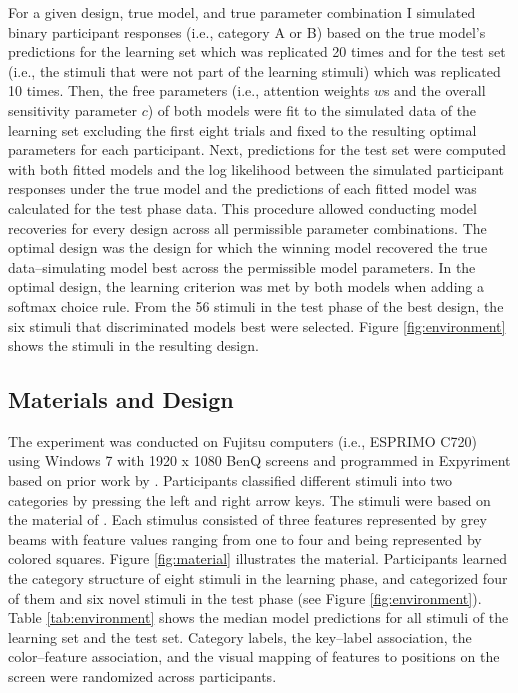 \documentclass[a4paper,man,natbib]{apa6}
\begin{document}
For a given design, true model, and true parameter combination I simulated binary participant responses (i.e., category A or B) based on the true model's predictions for the learning set which was replicated 20 times and for the test set (i.e., the stimuli that were not part of the learning stimuli) which was replicated 10 times. Then, the free parameters (i.e., attention weights $w$s and the overall sensitivity parameter $c$) of both models were fit to the simulated data of the learning set excluding the first eight trials and fixed to the resulting optimal parameters for each participant. Next, predictions for the test set were computed with both fitted models and the log likelihood between the simulated participant responses under the true model and the predictions of each fitted model was calculated for the test phase data. This procedure allowed conducting model recoveries for every design across all permissible parameter combinations. The optimal design was the design for which the winning model recovered the true data--simulating model best across the permissible model parameters. In the optimal design, the learning criterion was met by both models when adding a softmax choice rule. From the 56 stimuli in the test phase of the best design, the six stimuli that discriminated models best were selected. Figure \ref{fig:environment} shows the stimuli in the resulting design.

\subsection{Materials and Design}
The experiment was conducted on Fujitsu computers (i.e., ESPRIMO C720) using Windows 7 with 1920 x 1080 BenQ screens and programmed in Expyriment \citep{krause2014expyriment} based on prior work by \cite{albrechtxxxunstacking}. Participants classified different stimuli into two categories by pressing the left and right arrow keys. The stimuli were based on the material of \cite{albrechtxxxunstacking}. Each stimulus consisted of three features represented by grey beams with feature values ranging from one to four and being represented by colored squares. Figure \ref{fig:material} illustrates the material. Participants learned the category structure of eight stimuli in the learning phase, and categorized four of them and six novel stimuli in the test phase (see Figure \ref{fig:environment}). Table \ref{tab:environment} shows the median model predictions for all stimuli of the learning set and the test set. Category labels, the key--label association, the color--feature association, and the visual mapping of features to positions on the screen were randomized across participants.
\end{document}
